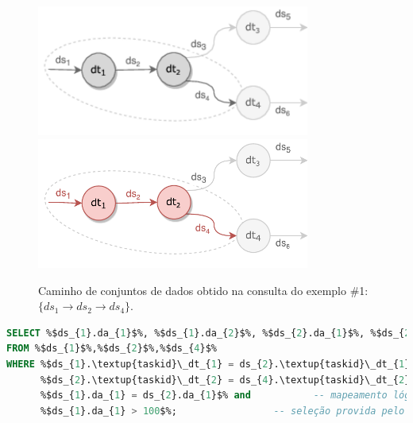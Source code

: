 \begin{figure}[!htb]
    \centering
    \ifprint
    \includegraphics[width=0.8\textwidth]{img/example-query-dataflow-1_bw}
    \else
    \includegraphics[width=0.8\textwidth]{img/example-query-dataflow-1}
    \fi
    \caption[Caminho obtido na consulta do exemplo \#1]{Caminho de conjuntos de dados obtido na consulta do exemplo \#1: \(\{ds_{1} \rightarrow ds_{2} \rightarrow ds_{4}\}.\)}%
    \label{fig:example-query-dataflow-1}
\end{figure}

\begin{minipage}[c]{0.95\textwidth}
\begin{lstlisting}[language=sql,label={lst:example-query-output-1},caption={[Código SQL gerado no exemplo~\#1]Código SQL gerado pela função \texttt{generateSqlQuery} no exemplo~\#1.}]
SELECT %$ds_{1}.da_{1}$%, %$ds_{1}.da_{2}$%, %$ds_{2}.da_{1}$%, %$ds_{2}.da_{2}$%, %$ds_{4}.da_{3}$%
FROM %$ds_{1}$%,%$ds_{2}$%,%$ds_{4}$%
WHERE %$ds_{1}.\textup{taskid}\_dt_{1} = ds_{2}.\textup{taskid}\_dt_{1}$% and -- mapeamento físico
      %$ds_{2}.\textup{taskid}\_dt_{2} = ds_{4}.\textup{taskid}\_dt_{2}$% and -- mapeamento físico
      %$ds_{1}.da_{1} = ds_{2}.da_{1}$% and           -- mapeamento lógico
      %$ds_{1}.da_{1} > 100$%;                 -- seleção provida pelo usuário
\end{lstlisting}
\end{minipage}

